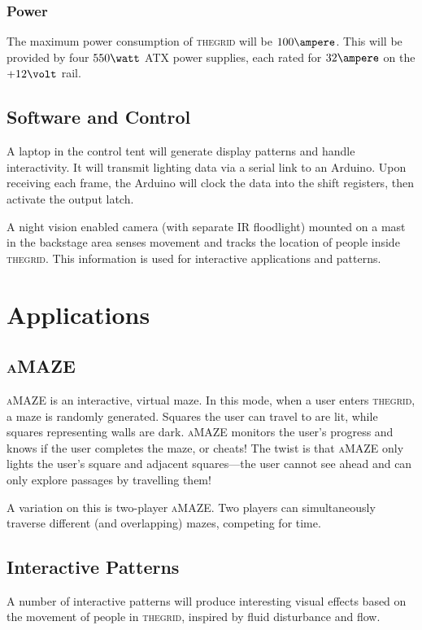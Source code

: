 \documentclass[12pt]{article} %
\newcommand{\thegrid}{\textsc{the\textperiodcentered grid}\xspace}
\newcommand{\amaze}{\textsc{aMAZE}\xspace}
\begin{document}
\subsubsection{Power}
The maximum power consumption of \thegrid will be $100\ampere$.  This will be provided by four $550\watt$ ATX power supplies, each rated for $32\ampere$ on the $+12\volt$ rail.

\subsection{Software and Control}
A laptop in the control tent will generate display patterns and handle interactivity.  It will transmit lighting data via a serial link to an Arduino.  Upon receiving each frame, the Arduino will clock the data into the shift registers, then activate the output latch.

A night vision enabled camera (with separate IR floodlight) mounted on a mast in the backstage area senses movement and tracks the location of people inside \thegrid.  This information is used for interactive applications and patterns.

\section{Applications}
\subsection{\amaze}
\amaze is an interactive, virtual maze.  In this mode, when a user enters \thegrid, a maze is randomly generated.  Squares the user can travel to are lit, while squares representing walls are dark.  \amaze monitors the user's progress and knows if the user completes the maze, or cheats!  The twist is that \amaze only lights the user's square and adjacent squares---the user cannot see ahead and can only explore passages by travelling them!

A variation on this is two-player \amaze.  Two players can simultaneously traverse different (and overlapping) mazes, competing for time.

\subsection{Interactive Patterns}
A number of interactive patterns will produce interesting visual effects based on the movement of people in \thegrid, inspired by fluid disturbance and flow.
\end{document}
